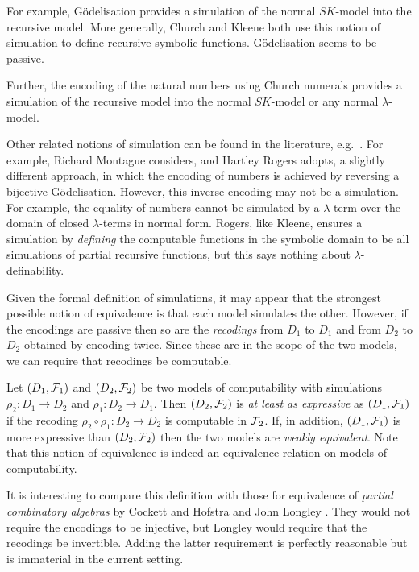 \documentclass[a4paper]{article}
\begin{document}
For example, G\"odelisation provides a simulation of the normal
$SK$-model into the recursive model. More generally, Church and Kleene
both use this notion of simulation to define  recursive
symbolic functions. 
G\"odelisa\-tion seems to be passive.

Further, the encoding of the natural numbers using Church numerals
provides a simulation of the recursive model into the normal
$SK$-model or any normal $\lambda$-model.  


Other related notions of simulation can be found in the literature,
e.g.\ \cite{Jones97, BokerD06}.  For example, Richard Montague
\cite[page 430]{Montague60} considers, and Hartley Rogers \cite[page
28]{Rogers67} adopts, a slightly different approach, in which the
encoding of numbers is achieved by reversing a bijective
G\"odelisation.  However, this inverse encoding may not be a
simulation.  For example, the equality of numbers cannot be simulated
by a $\lambda$-term over the domain of closed $\lambda$-terms in normal form.
Rogers, like Kleene, ensures a simulation by {\em defining} the
computable functions in the symbolic domain to be all simulations of
partial recursive functions, but this says nothing about
$\lambda$-definability.

Given the formal definition of simulations, it may appear that the
strongest possible notion of equivalence is that each model simulates
the other. However, if the encodings are passive then so are the {\em
  recodings} from $D_1$ to $D_1$ and from $D_2$ to $D_2$ obtained by
encoding twice.  Since these are in the scope of the two models, we
can require that recodings be computable.

Let $(D_1, {\cal F}_1)$ and $(D_2, {\cal F}_2)$ be two models of
computability with simulations $\rho_2 : D_1 \to D_2$ and $\rho_1 :
D_2 \to D_1$. Then $(D_2,{\cal F}_2)$ is {\em at least as expressive} as
$(D_1,{\cal F}_1)$ if the recoding $\rho_2\circ\rho_1 : D_2 \to D_2$
is computable in ${\cal F}_2$. If, in addition, $(D_1,{\cal F}_1)$ is
more expressive than $(D_2,{\cal F}_2)$ then the two models are {\em
  weakly equivalent}. 
Note that this notion of equivalence is indeed an equivalence
relation on models of computability.

It is interesting to compare this definition with those for
equivalence of {\em partial combinatory algebras} by Cockett and
Hofstra \cite{CH2010} and John Longley \cite{Longley14}.  They would
not require the encodings to be injective, but Longley
would require that the recodings be invertible. Adding the latter
requirement is perfectly reasonable but is immaterial in the current
setting.
\end{document}

